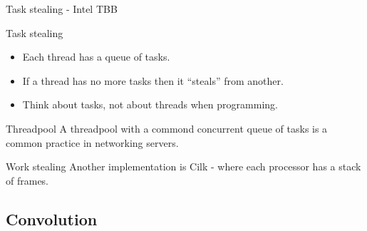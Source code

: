 \documentclass{beamer}
\begin{document}

\begin{frame}[fragile]{Task stealing - Intel TBB}

\begin{block}{Task stealing}
\begin{itemize}
  \item Each thread has a queue of tasks.
  \item If a thread has no more tasks then it ``steals'' from another.
  \item Think about tasks, not about threads when programming.
\end{itemize}
\end{block}

\begin{exampleblock}{Threadpool}
A threadpool with a commond concurrent queue of tasks is a common practice in networking servers.
\end{exampleblock}

\begin{exampleblock}{Work stealing}
Another implementation is Cilk\cite{cilk} - where each processor has a stack of frames.
\end{exampleblock}


\end{frame}


\subsection{Convolution}

\end{document}
